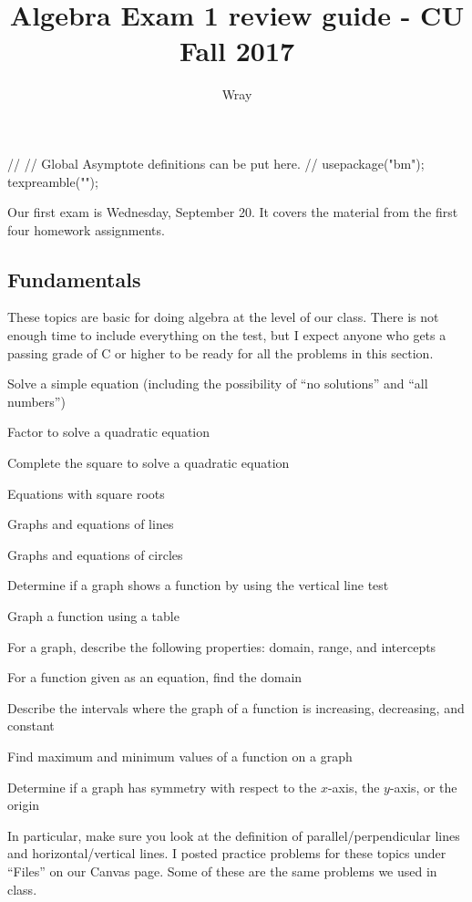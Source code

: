 \documentclass[addpoints, 12pt]{exam}
\title{Algebra Exam 1 review guide - CU Fall 2017}
\author{Wray}
\begin{document}
\begin{asydef}
//
// Global Asymptote definitions can be put here.
//
usepackage("bm");
texpreamble("\def\V#1{\bm{#1}}");
\end{asydef}

\bigskip             
\bigskip

Our first exam is Wednesday, September 20.  It covers the material from the first four homework assignments.

\subsection*{Fundamentals}

These topics are basic for doing algebra at the level of our class.  There is not enough time to include everything on the test, but I expect anyone who gets a passing grade of C or higher to be ready for all the problems in this section.
\bigskip

Solve a simple equation (including the possibility of ``no solutions'' and ``all numbers'')

Factor to solve a quadratic equation

Complete the square to solve a quadratic equation

Equations with square roots

Graphs and equations of lines

Graphs and equations of circles

Determine if a graph shows a function by using the vertical line test

Graph a function using a table

For a graph, describe the following properties: domain, range, and intercepts

For a function given as an equation, find the domain

Describe the intervals where the graph of a function is increasing, decreasing, and constant

Find maximum and minimum values of a function on a graph

Determine if a graph has symmetry with respect to the $x$-axis, the $y$-axis, or the origin
\bigskip

In particular, make sure you look at the definition of parallel/perpendicular lines and horizontal/vertical lines.  I posted practice problems for these topics under ``Files'' on our Canvas page.  Some of these are the same problems we used in class.
\bigskip
\end{document}
